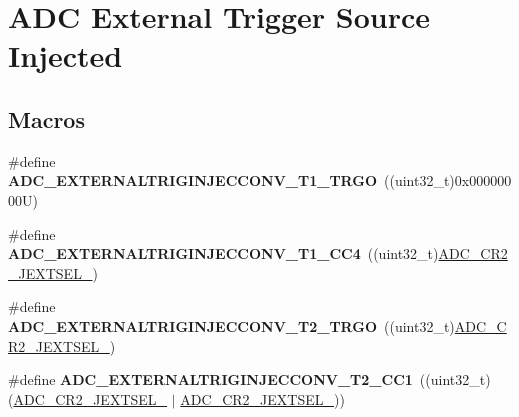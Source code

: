 \hypertarget{group___a_d_c_ex___external__trigger___source___injected}{}\section{A\+DC External Trigger Source Injected}
\label{group___a_d_c_ex___external__trigger___source___injected}
\subsection*{Macros}
\begin{DoxyCompactItemize}
\item 
\mbox{\label{group___a_d_c_ex___external__trigger___source___injected_ga577c4e4b766688d873ab518fa4e8cef0}} 
\#define {\bfseries A\+D\+C\+\_\+\+E\+X\+T\+E\+R\+N\+A\+L\+T\+R\+I\+G\+I\+N\+J\+E\+C\+C\+O\+N\+V\+\_\+\+T1\+\_\+\+T\+R\+GO}~((uint32\+\_\+t)0x00000000\+U)
\item 
\mbox{\label{group___a_d_c_ex___external__trigger___source___injected_ga50c7351afe9cf0960de8f2ae831d8a0b}} 
\#define {\bfseries A\+D\+C\+\_\+\+E\+X\+T\+E\+R\+N\+A\+L\+T\+R\+I\+G\+I\+N\+J\+E\+C\+C\+O\+N\+V\+\_\+\+T1\+\_\+\+C\+C4}~((uint32\+\_\+t)\mbox{\hyperlink{group___peripheral___registers___bits___definition_gaa70c1f30e2101e2177ce564440203ba3}{A\+D\+C\+\_\+\+C\+R2\+\_\+\+J\+E\+X\+T\+S\+E\+L\+\_}})
\item 
\mbox{\label{group___a_d_c_ex___external__trigger___source___injected_ga5408c05ebc9a0a16c08b0be0e79506dc}} 
\#define {\bfseries A\+D\+C\+\_\+\+E\+X\+T\+E\+R\+N\+A\+L\+T\+R\+I\+G\+I\+N\+J\+E\+C\+C\+O\+N\+V\+\_\+\+T2\+\_\+\+T\+R\+GO}~((uint32\+\_\+t)\mbox{\hyperlink{group___peripheral___registers___bits___definition_ga99fa4a240d34ce231d6d0543bac7fd9b}{A\+D\+C\+\_\+\+C\+R2\+\_\+\+J\+E\+X\+T\+S\+E\+L\+\_}})
\item 
\mbox{\label{group___a_d_c_ex___external__trigger___source___injected_gaadc7ecf196e883d7375e299dde80a8fa}} 
\#define {\bfseries A\+D\+C\+\_\+\+E\+X\+T\+E\+R\+N\+A\+L\+T\+R\+I\+G\+I\+N\+J\+E\+C\+C\+O\+N\+V\+\_\+\+T2\+\_\+\+C\+C1}~((uint32\+\_\+t)(\mbox{\hyperlink{group___peripheral___registers___bits___definition_ga99fa4a240d34ce231d6d0543bac7fd9b}{A\+D\+C\+\_\+\+C\+R2\+\_\+\+J\+E\+X\+T\+S\+E\+L\+\_}} $\vert$ \mbox{\hyperlink{group___peripheral___registers___bits___definition_gaa70c1f30e2101e2177ce564440203ba3}{A\+D\+C\+\_\+\+C\+R2\+\_\+\+J\+E\+X\+T\+S\+E\+L\+\_}}))

\end{DoxyCompactItemize}
